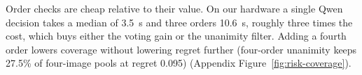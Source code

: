 Order checks are cheap relative to their value. On our hardware a single Qwen decision takes a median of 3.5~s and three orders 10.6~s, roughly three times the cost, which buys either the voting gain or the unanimity filter. Adding a fourth order lowers coverage without lowering regret further (four-order unanimity keeps 27.5\% of four-image pools at regret 0.095) (Appendix Figure~\ref{fig:risk-coverage}).
